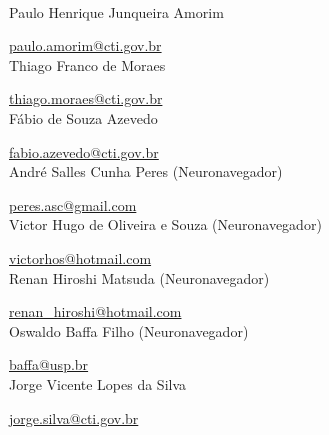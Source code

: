 \scalebox{2.0}{\sffamily Autores do Manual}
\\

Paulo Henrique Junqueira Amorim

\href{mailto:paulo.amorim@cti.gov.br}{paulo.amorim@cti.gov.br}
\\


Thiago Franco de Moraes


\href{mailto:thiago.moraes@cti.gov.br}{thiago.moraes@cti.gov.br}
\\

Fábio de Souza Azevedo


\href{mailto:fabio.azevedo@cti.gov.br}{fabio.azevedo@cti.gov.br}
\\


André Salles Cunha Peres (Neuronavegador)

\href{mailto:peres.asc@gmail.com}{peres.asc@gmail.com}
\\

Victor Hugo de Oliveira e Souza  (Neuronavegador)

\href{mailto:victorhos@hotmail.com}{victorhos@hotmail.com}
\\


Renan Hiroshi Matsuda (Neuronavegador)

\href{mailto:renan\_hiroshi@hotmail.com}{renan\_hiroshi@hotmail.com}
\\


Oswaldo Baffa Filho (Neuronavegador)

\href{mailto:baffa@usp.br}{baffa@usp.br}
\\

Jorge Vicente Lopes da Silva


\href{mailto:jorge.silva@cti.gov.br}{jorge.silva@cti.gov.br}
\\


